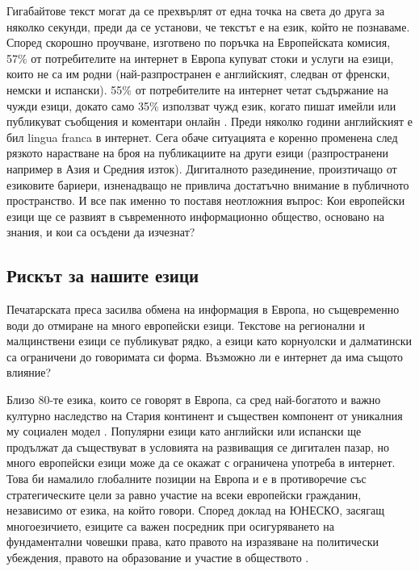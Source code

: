 \begin{multicols}{2}
  Гигабайтове текст могат да се прехвърлят от една точка на света до друга за няколко секунди, преди да се установи, че текстът е на език, който не познаваме. Според скорошно проучване, изготвено по поръчка на Европейската
   комисия, 57\% от потребителите на интернет в Европа
   купуват стоки и услуги на езици, които не са им родни
   (най-разпространен е английският, следван от
   френски, немски и испански). 55\% от потребителите на интернет четат съдържание на чужди езици, докато само 35\% използват чужд език, когато пишат имейли или публикуват съобщения и коментари онлайн \cite{EC1}. Преди няколко
   години английският е бил lingua franca в интернет. Сега обаче ситуацията е коренно променена след  рязкото нарастване  на броя на публикациите на други езици (разпространени например в Азия и Средния изток). Дигиталното разединение, произтичащо от езиковите бариери, 
   изненадващо не привлича достатъчно внимание в публичното
   пространство. И все пак именно то поставя неотложния
   въпрос: Кои европейски езици ще се развият в съвременното информационно общество, основано на знания, и кои са осъдени да изчезнат?

  \subsection{Рискът за нашите езици}

  Печатарската преса засилва обмена на информация в Европа, но същевременно води до отмиране на много европейски езици. Текстове на регионални и малцинствени езици се публикуват рядко, а  езици като корнуолски и далматински са ограничени до говоримата си форма. Възможно ли е интернет да има същото влияние?

  Близо  80-те езика, които се говорят в Европа, са сред
   най-богатото и важно културно наследство на Стария континент и съществен  компонент от уникалния му социален модел  \cite{EC2}. Популярни езици като английски или испански ще продължат да съществуват в условията на развиващия се дигитален пазар, но много европейски езици може да се окажат
  с ограничена употреба в интернет. Това би намалило глобалните позиции на Европа и е в противоречие със стратегическите цели за равно участие на всеки европейски
   гражданин, независимо от езика, на който говори. Според доклад на ЮНЕСКО, засягащ многоезичието,  езиците са важен посредник при осигуряването на
  фундаментални  човешки права, като правото
   на изразяване на политически убеждения, правото на образование и участие в обществото \cite{Unesco1}.


\end{multicols}
